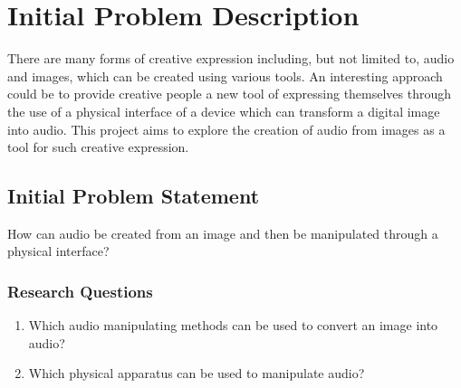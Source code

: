 \chapter{Initial Problem Description}\label{ch:initproblem}
There are many forms of creative expression including, but not limited to, audio and images, which can be created using various tools. An interesting approach could be to provide creative people a new tool of expressing themselves through the use of a physical interface of a device which can transform a digital image into audio. This project aims to explore the creation of audio from images as a tool for such creative expression.
\section{Initial Problem Statement}\label{inistatement}

How can audio be created from an image and then be manipulated through a physical interface? 

\subsection{Research Questions}\label{resquestions}

\begin{enumerate}
\item Which audio manipulating methods can be used to convert an image into audio?
\item Which physical apparatus can be used to manipulate audio?

\end{enumerate}